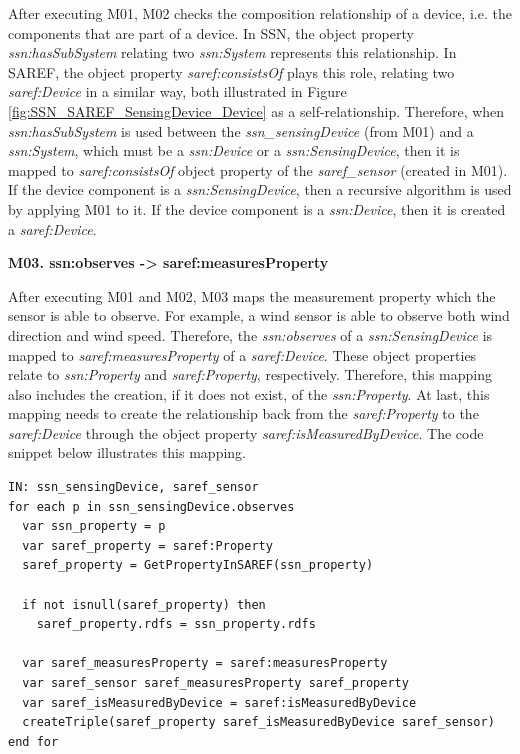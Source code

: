 \documentclass{sig-alternate-05-2015}
\begin{document}
\noindent
After executing M01, M02 checks the composition relationship of a device, i.e. the components that are part of a device. In SSN, the object property \textit{ssn:\-hasSubSystem} relating two \textit{ssn:\-System} represents this relationship. In SAREF, the object property \textit{saref:\-consistsOf} plays this role, relating two \textit{saref:\-Device} in a similar way, both illustrated in Figure \ref{fig:SSN_SAREF_SensingDevice_Device} as a self-relationship. Therefore, when \textit{ssn:\-hasSubSystem} is used between the \textit{ssn\_sensingDevice} (from M01) and a \textit{ssn:\-System}, which must be a \textit{ssn:\-Device} or a \textit{ssn:\-SensingDevice}, then it is mapped to \textit{saref:\-consistsOf} object property of the \textit{saref\_sensor} (created in M01). If the device component is a \textit{ssn:\-SensingDevice}, then a recursive algorithm is used by applying M01 to it. If the device component is a \textit{ssn:\-Device}, then it is created a \textit{saref:\-Device}. 

\noindent
\newline
\textbf{M03. ssn:\-observes -> saref:\-measuresProperty}

\noindent
After executing M01 and M02, M03 maps the measurement property which the sensor is able to observe. For example, a wind sensor is able to observe both wind direction and wind speed. Therefore, the \textit{ssn:\-observes} of a \textit{ssn:\-SensingDevice} is mapped to \textit{saref:\-measuresProperty} of a \textit{saref:\-Device}. These object properties relate to \textit{ssn:\-Property} and \textit{saref:\-Property}, respectively. Therefore, this mapping also includes the creation, if it does not exist, of the \textit{ssn:\-Property}. At last, this mapping needs to create the relationship back from the \textit{saref:\-Property} to the \textit{saref:\-Device} through the object property \textit{saref:\-isMeasuredByDevice}. The code snippet below illustrates this mapping. 

\begin{lstlisting}[caption={Pseudocode snippet for M03},label={code:sample},captionpos=b]
IN: ssn_sensingDevice, saref_sensor
for each p in ssn_sensingDevice.observes 
  var ssn_property = p
  var saref_property = saref:Property 
  saref_property = GetPropertyInSAREF(ssn_property)
    
  if not isnull(saref_property) then 
    saref_property.rdfs = ssn_property.rdfs 
 
  var saref_measuresProperty = saref:measuresProperty 
  var saref_sensor saref_measuresProperty saref_property 
  var saref_isMeasuredByDevice = saref:isMeasuredByDevice
  createTriple(saref_property saref_isMeasuredByDevice saref_sensor)
end for
\end{lstlisting}
\end{document}

